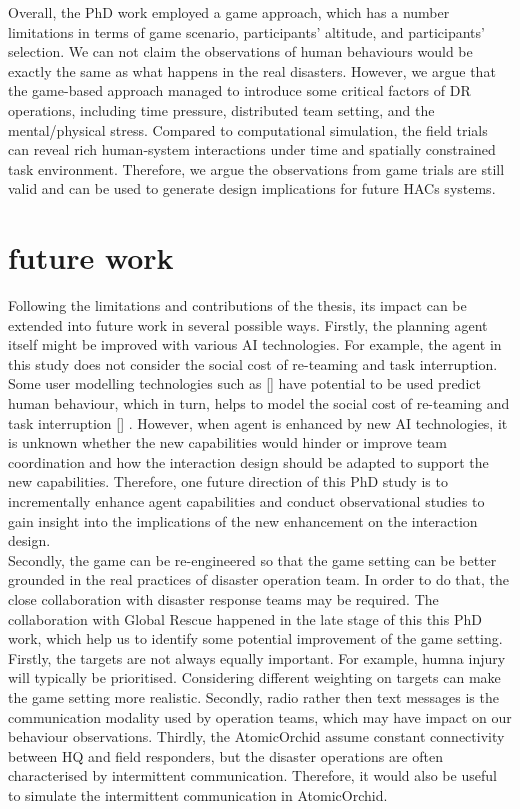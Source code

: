 Overall, the PhD work employed a game approach, which has a number limitations in terms of game scenario, participants' altitude, and participants' selection.  We can not claim the observations of human behaviours would be exactly the same as what happens in the real disasters. However, we argue that the game-based approach managed to introduce some critical factors of DR operations, including time pressure, distributed team setting, and the mental/physical stress. Compared to computational simulation, the field trials can reveal rich human-system interactions under time and spatially constrained task environment. Therefore, we argue the observations from game trials are still valid and can be used to generate design implications for future HACs systems. 

\section{future work}
Following the limitations and contributions of the thesis, its impact can be extended into future work in several possible ways. Firstly, the planning agent itself might be improved with various AI technologies. For example, the agent in this study does not consider the social cost of re-teaming and task interruption. Some user modelling technologies such as [] have potential to be used predict human behaviour, which in turn, helps to model the social cost of re-teaming and task interruption  [] . However, when agent is enhanced by new AI technologies, it is unknown whether the new capabilities would hinder or improve team coordination and how the interaction design should be adapted to support the new capabilities.  Therefore, one future direction of this PhD study is to incrementally enhance agent capabilities and conduct observational studies to gain insight into the implications of the new enhancement on the interaction design.\\

Secondly, the game can be re-engineered so that the game setting can be better grounded in the real practices of disaster operation team. In order to do that, the close collaboration with disaster response teams may be required. The collaboration with Global Rescue happened  in the late stage of this this PhD work, which help us to identify some potential improvement of the game setting. Firstly, the targets are not always equally important. For example, humna injury will typically be prioritised. Considering different weighting on targets can make the game setting more realistic. Secondly, radio rather then text messages is the communication modality used by operation teams, which may have impact on our behaviour observations. Thirdly, the AtomicOrchid assume constant connectivity between HQ and field responders, but the disaster operations are often characterised by intermittent communication. Therefore, it would also be useful to simulate the intermittent communication in AtomicOrchid.  \\

